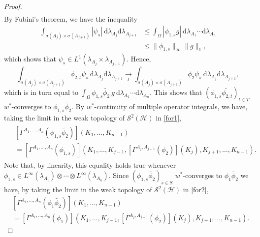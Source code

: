 \documentclass[12pt]{amsart}
\theoremstyle{remark}
\begin{document}
\begin{proof}
\begin{align*}
\end{align*}
By Fubini's theorem, we have the inequality
\begin{align*}
\int_{\sigma(A_j) \times \sigma(A_{j+1})} | \psi_s | \ \text{d}\lambda_{A_j}\text{d}\lambda_{A_{j+1}}
& \leq \int_{\Omega} | \phi_{1,s} g | \ \text{d}\lambda_{A_1} \cdots \text{d}\lambda_{A_n} \\
& \leq \| \phi_{1,s} \|_{\infty} \| g\|_{1},
\end{align*}
which shows that $\psi_s \in L^1(\lambda_{A_j} \times \lambda_{A_{j+1}})$. Hence,
$$
\int_{\sigma(A_j) \times \sigma(A_{j+1})} \phi_{2,t} \psi_s \ \text{d}\lambda_{A_j}\text{d}\lambda_{A_{j+1}} \underset{t}{\longrightarrow} \int_{\sigma(A_j) \times \sigma(A_{j+1})} \phi_2 \psi_s \ \text{d}\lambda_{A_j}\text{d}\lambda_{A_{j+1}},
$$
which is in turn equal to $\displaystyle \int_{\Omega} \phi_{1,s} \widetilde{\phi_2} ~ g \ \text{d}\lambda_{A_1} \cdots \text{d}\lambda_{A_n}$. This shows that $(\phi_{1,s} \widetilde{\phi_{2,t}})_{t\in T}$ $w^*$-converges to $\phi_{1,s} \widetilde{\phi_2}$. By $w^*$-continuity of multiple operator integrals, we have, taking the limit in the weak topology of $\mathcal{S}^2(\mathcal{H})$ in \eqref{for1},
\begin{align}\label{for2}
\begin{split}
& \left[ \Gamma^{A_1, \ldots, A_n}(\phi_{1,s} \widetilde{\phi_2})\right] (K_1, \ldots, K_{n-1}) \\
& = \left[ \Gamma^{A_1, \ldots, A_n}(\phi_{1,s})\right] \left(K_1, \ldots, K_{j-1}, \left[\Gamma^{A_j, A_{j+1}}(\phi_2)\right](K_j), K_{j+1}, \ldots, K_{n-1}\right).
\end{split}
\end{align}
Note that, by linearity, this equality holds true whenever $\phi_{1,s} \in L^{\infty}(\lambda_{A_1}) \otimes \cdots \otimes L^{\infty}(\lambda_{A_n}).$ Since $(\phi_{1,s} \widetilde{\phi_2})_{s\in S}$ $w^*$-converges to $\phi_1 \widetilde{\phi_2}$ we have, by taking the limit in the weak topology of $\mathcal{S}^2(\mathcal{H})$ in \eqref{for2},
\begin{align*}
& \left[ \Gamma^{A_1, \ldots, A_n}(\phi_1 \widetilde{\phi_2})\right] (K_1, \ldots, K_{n-1}) \\
& = \left[ \Gamma^{A_1, \ldots, A_n}(\phi_1)\right] \left(K_1, \ldots, K_{j-1}, \left[\Gamma^{A_j, A_{j+1}}(\phi_2)\right](K_j), K_{j+1}, \ldots, K_{n-1}\right).
\end{align*}


\end{proof}
\end{document}

